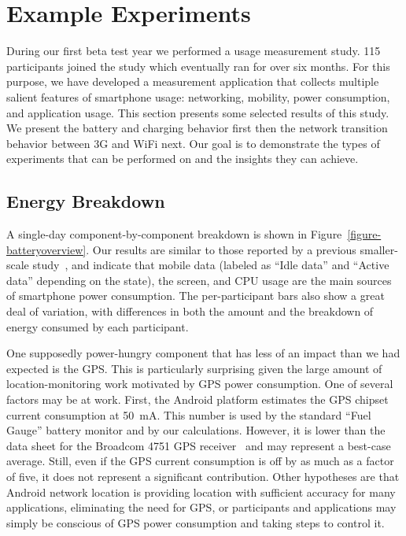 \section{Example Experiments}
\label{sec-experiments}

During our first beta test year we performed a usage measurement study. 115
participants joined the study which eventually ran for over six months. For
this purpose, we have developed a measurement application that collects
multiple salient features of smartphone usage: networking, mobility, power
consumption, and application usage. This section presents some selected
results of this study. We present the battery and charging behavior first
then the network transition behavior between 3G and WiFi next. Our goal is to
demonstrate the types of experiments that can be performed on \PhoneLab{} and
the insights they can achieve.

\subsection{Energy Breakdown}
\label{subsec-energybreakdown}

A single-day component-by-component breakdown is shown in
Figure~\ref{figure-batteryoverview}. Our results are similar to those reported
by a previous smaller-scale study~\cite{shye:micro:2009}, and indicate that
mobile data (labeled as ``Idle data'' and ``Active data'' depending on the
state), the screen, and CPU usage are the main sources of smartphone power
consumption. The per-participant bars also show a great deal of variation, with
differences in both the amount and the breakdown of energy consumed by each
participant.

One supposedly power-hungry component that has less of an impact than we had
expected is the GPS. This is particularly surprising given the large amount
of location-monitoring work motivated by GPS power consumption. One of
several factors may be at work. First, the Android platform estimates the GPS
chipset current consumption at 50~mA. This number is used by the standard
``Fuel Gauge'' battery monitor and by our calculations. However, it is lower
than the data sheet for the Broadcom 4751 GPS receiver~\cite{bcm4751} and may
represent a best-case average. Still, even if the GPS current consumption is
off by as much as a factor of five, it does not represent a significant
contribution. Other hypotheses are that Android network location is providing
location with sufficient accuracy for many applications, eliminating the need
for GPS, or participants and applications may simply be conscious of GPS
power consumption and taking steps to control it.


